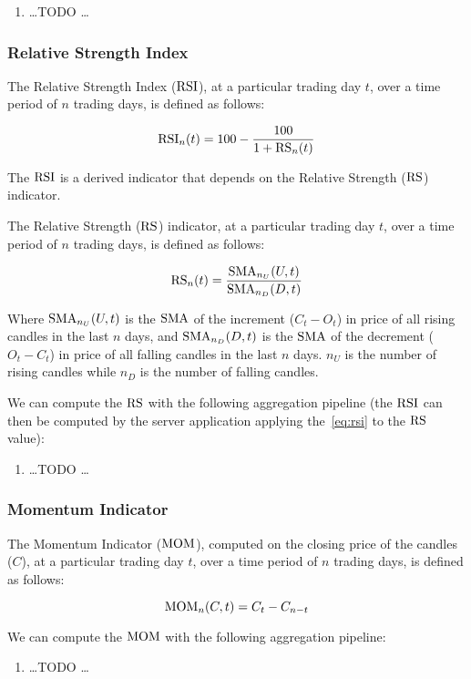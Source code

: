 \begin{enumerate}
	\item \ldots TODO \ldots
\end{enumerate}

\subsubsection{Relative Strength Index}

The Relative Strength Index (\(\operatorname{RSI}\)), at a particular trading day \(t\), over
a time period of \(n\) trading days, is defined as follows:

\begin{equation}\label{eq:rsi}
	\operatorname{RSI}_n(t) = 100 - \frac{100}{1 + \operatorname{RS}_n(t)}
\end{equation}

The \(\operatorname{RSI}\) is a derived indicator that depends on the Relative Strength
(\(\operatorname{RS}\)) indicator.

The Relative Strength (\(\operatorname{RS}\)) indicator, at a particular trading day \(t\),
over a time period of \(n\) trading days, is defined as follows:

\begin{equation}\label{eq:rs}
	\operatorname{RS}_n(t) = \frac{\operatorname{SMA}_{n_U}(U,t)}{\operatorname{SMA}_{n_D}(D,t)}
\end{equation}

Where \(\operatorname{SMA}_{n_U}(U,t)\) is the \(\operatorname{SMA}\) of the increment (\(C_t - O_t\)) in
price of all rising candles in the last \(n\) days, and \(\operatorname{SMA}_{n_D}(D,t)\) is
the \(\operatorname{SMA}\) of the decrement (\(O_t - C_t\)) in price of all falling candles in
the last \(n\) days. \(n_U\) is the number of rising candles while \(n_D\) is
the number of falling candles.

We can compute the \(\operatorname{RS}\) with the following aggregation pipeline (the \(\operatorname{RSI}\)
can then be computed by the server application applying the~\eqref{eq:rsi} to
the \(\operatorname{RS}\) value):

\begin{enumerate}
	\item \ldots TODO \ldots
\end{enumerate}

\subsubsection{Momentum Indicator}

The Momentum Indicator (\(\operatorname{MOM}\)), computed on the closing price of the candles
(\(C\)), at a particular trading day \(t\), over a time period of \(n\) trading
days, is defined as follows:

\begin{equation}\label{eq:mom}
	\operatorname{MOM}_n(C,t) = C_t - C_{n-t}
\end{equation}

We can compute the \(\operatorname{MOM}\) with the following aggregation pipeline:

\begin{enumerate}
	\item \ldots TODO \ldots
\end{enumerate}
